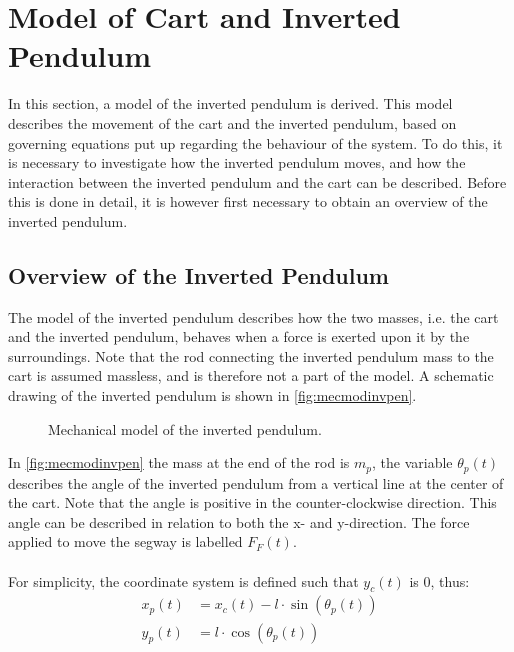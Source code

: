 \section{Model of Cart and Inverted Pendulum \label{sec:pen_model}}
In this section, a model of the inverted pendulum is derived. This model describes the movement of the cart and the inverted pendulum, based on governing equations put up regarding the behaviour of the system. To do this, it is necessary to investigate how the inverted pendulum moves, and how the interaction between the inverted pendulum and the cart can be described. Before this is done in detail, it is however first necessary to obtain an overview of the inverted pendulum.
\subsection{Overview of the Inverted Pendulum}
The model of the inverted pendulum describes how the two masses, i.e. the cart and the inverted pendulum, behaves when a force is exerted upon it by the surroundings. Note that the rod connecting the inverted pendulum mass to the cart is assumed massless, and is therefore not a part of the model. A schematic drawing of the inverted pendulum is shown in \autoref{fig:mecmodinvpen}.
\begin{figure}[H]
\centering
\scalebox{0.6}{}
\caption{Mechanical model of the inverted pendulum.}
\label{fig:mecmodinvpen}
\end{figure}
In \autoref{fig:mecmodinvpen} the mass at the end of the rod is $m_p$, the variable $\theta_p(t)$ describes the angle of the inverted pendulum from a vertical line at the center of the cart. Note that the angle is positive in the counter-clockwise direction. This angle can be described in relation to both the x- and y-direction. The force applied to move the segway is labelled $F_F(t)$.\\\\
For simplicity, the coordinate system is defined such that $y_c(t)$ is 0, thus:
\begin{align}
x_p(t)&= x_c(t)- l \cdot \sin(\theta_p(t))\\
y_p(t)&= l\cdot \cos(\theta_p(t)) 
\end{align}
\begin{where}
\\
\\
\\
\\
\\
\end{where}

